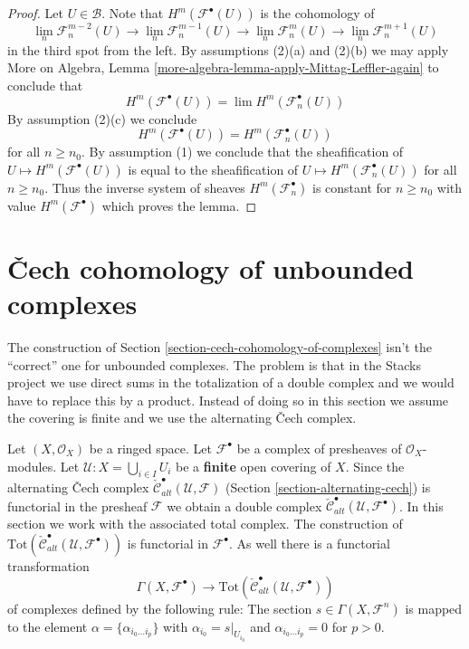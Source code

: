 \begin{proof}
Let $U \in \mathcal{B}$. Note that $H^m(\mathcal{F}^\bullet(U))$ is the
cohomology of
$$
\lim_n \mathcal{F}_n^{m - 2}(U) \to
\lim_n \mathcal{F}_n^{m - 1}(U) \to
\lim_n \mathcal{F}_n^m(U) \to
\lim_n \mathcal{F}_n^{m + 1}(U)
$$
in the third spot from the left. By assumptions (2)(a) and (2)(b)
we may apply
More on Algebra, Lemma \ref{more-algebra-lemma-apply-Mittag-Leffler-again}
to conclude that
$$
H^m(\mathcal{F}^\bullet(U)) = \lim H^m(\mathcal{F}_n^\bullet(U))
$$
By assumption (2)(c) we conclude
$$
H^m(\mathcal{F}^\bullet(U)) = H^m(\mathcal{F}_n^\bullet(U))
$$
for all $n \geq n_0$. By assumption (1) we conclude that the sheafification of
$U \mapsto H^m(\mathcal{F}^\bullet(U))$ is equal to the sheafification
of $U \mapsto H^m(\mathcal{F}_n^\bullet(U))$ for all $n \geq n_0$.
Thus the inverse system of sheaves $H^m(\mathcal{F}_n^\bullet)$ is
constant for $n \geq n_0$ with value $H^m(\mathcal{F}^\bullet)$ which
proves the lemma.
\end{proof}











\section{{\v C}ech cohomology of unbounded complexes}
\label{section-cech-cohomology-of-unbounded-complexes}

\noindent
The construction of Section \ref{section-cech-cohomology-of-complexes}
isn't the ``correct'' one for unbounded complexes. The problem is that
in the Stacks project we use direct sums in the totalization of a
double complex and we would have to replace this by a product. Instead
of doing so in this section we assume the covering is finite and
we use the alternating {\v C}ech complex.

\medskip\noindent
Let $(X, \mathcal{O}_X)$ be a ringed space.
Let ${\mathcal F}^\bullet$ be a complex of presheaves of
$\mathcal{O}_X$-modules. Let ${\mathcal U} : X = \bigcup_{i \in I} U_i$
be a {\bf finite} open covering of $X$. Since the alternating
{\v C}ech complex
$\check{\mathcal{C}}_{alt}^\bullet(\mathcal{U}, \mathcal{F})$
(Section \ref{section-alternating-cech})
is functorial in the presheaf $\mathcal{F}$ we obtain a double complex
$\check{\mathcal{C}}^\bullet_{alt}(\mathcal{U}, \mathcal{F}^\bullet)$.
In this section we work with the associated total complex.
The construction of
$\text{Tot}(\check{\mathcal{C}}^\bullet_{alt}({\mathcal U},
{\mathcal F}^\bullet))$
is functorial in ${\mathcal F}^\bullet$. As well there is a functorial
transformation
\begin{equation}
\label{equation-global-sections-to-alternating-cech}
\Gamma(X, {\mathcal F}^\bullet)
\longrightarrow
\text{Tot}(\check{\mathcal{C}}^\bullet_{alt}({\mathcal U},
{\mathcal F}^\bullet))
\end{equation}
of complexes defined by the following rule: The section
$s\in \Gamma(X, {\mathcal F}^n)$
is mapped to the element $\alpha = \{\alpha_{i_0\ldots i_p}\}$
with $\alpha_{i_0} = s|_{U_{i_0}}$ and $\alpha_{i_0\ldots i_p} = 0$
for $p > 0$.

